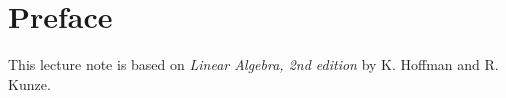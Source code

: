 \chapter*{Preface}
This lecture note is based on \textit{Linear Algebra, 2nd edition} by K. Hoffman and R. Kunze.